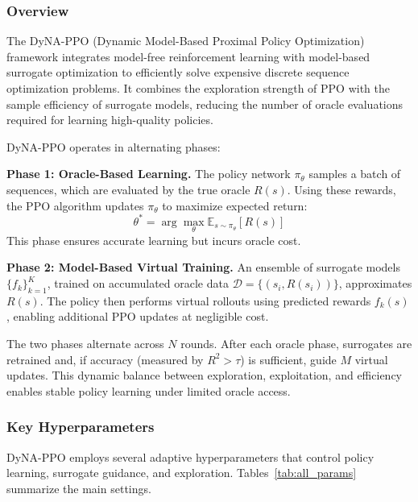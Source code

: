 \documentclass[conference]{IEEEtran}
\begin{document}
\subsubsection{Overview}

The DyNA-PPO (Dynamic Model-Based Proximal Policy Optimization) framework integrates model-free reinforcement learning with model-based surrogate optimization to efficiently solve expensive discrete sequence optimization problems. It combines the exploration strength of PPO with the sample efficiency of surrogate models, reducing the number of oracle evaluations required for learning high-quality policies.

DyNA-PPO operates in alternating phases:

\textbf{Phase 1: Oracle-Based Learning.}  
The policy network $\pi_\theta$ samples a batch of sequences, which are evaluated by the true oracle $R(s)$. Using these rewards, the PPO algorithm updates $\pi_\theta$ to maximize expected return:
\[
\theta^* = \arg\max_\theta \mathbb{E}_{s \sim \pi_\theta}[R(s)]
\]
This phase ensures accurate learning but incurs oracle cost.

\textbf{Phase 2: Model-Based Virtual Training.}  
An ensemble of surrogate models $\{f_k\}_{k=1}^K$, trained on accumulated oracle data $\mathcal{D} = \{(s_i, R(s_i))\}$, approximates $R(s)$. The policy then performs virtual rollouts using predicted rewards $f_k(s)$, enabling additional PPO updates at negligible cost.  

The two phases alternate across $N$ rounds. After each oracle phase, surrogates are retrained and, if accuracy (measured by $R^2 > \tau$) is sufficient, guide $M$ virtual updates. This dynamic balance between exploration, exploitation, and efficiency enables stable policy learning under limited oracle access.

\subsubsection{Key Hyperparameters}

DyNA-PPO employs several adaptive hyperparameters that control policy learning, surrogate guidance, and exploration. Tables~\ref{tab:all_params} summarize the main settings.
\end{document}
